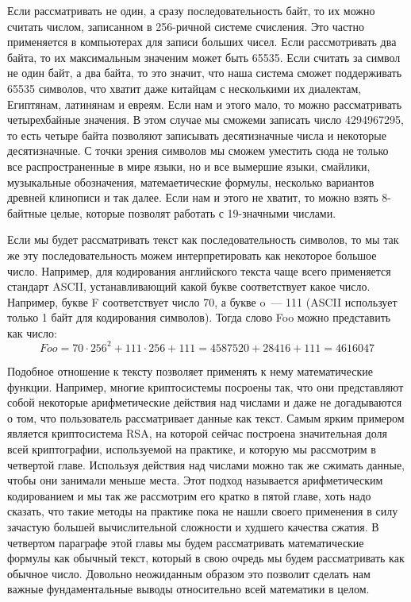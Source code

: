 Если рассматривать не один, а сразу последовательность байт, то их можно считать числом, записанном в 256-ричной системе счисления. Это частно применяется в компьютерах для записи больших чисел. Если рассмотривать два байта, то их максимальным значеним может быть 65535. Если считать за символ не один байт, а два байта, то это значит, что наша система сможет поддерживать 65535 символов, что хватит даже китайцам с несколькими их диалектам, Египтянам, латинянам и евреям. Если нам и этого мало, то можно рассматривать четырехбайные значения. В этом случае мы сможеми записать число 4294967295, то есть четыре байта позволяют записывать десятизначные числа и некоторые десятизначные. С точки зрения символов мы сможем уместить сюда не только все распространенные в мире языки, но и все вымершие языки, смайлики, музыкальные обозначения, матемаетические формулы, несколько вариантов древней клинописи и так далее. Если нам и этого не хватит, то можно взять 8-байтные целые, которые позволят работать с 19-значными числами.

Если мы будет рассматривать текст как последовательность символов, то мы так же эту последовательность можем интерпретировать как некоторое большое число. Например, для кодирования английского текста чаще всего применяется стандарт ASCII, устанавливающий какой букве соответствует какое число. Например, букве F соответствует число 70, а букве o~--- 111 (ASCII использует только 1 байт для кодирования символов). Тогда слово Foo можно представить как число:
$$Foo = 70 \cdot 256^2 + 111 \cdot 256 + 111 = 4587520 + 28416 + 111 = 4616047$$

Подобное отношение к тексту позволяет применять к нему математические функции. Например, многие криптосистемы посроены так, что они представляют собой некоторые арифметические действия над числами и даже не догадываются о том, что пользователь рассматривает данные как текст. Самым ярким примером является криптосистема RSA, на которой сейчас построена значительная доля всей криптографии, используемой на практике, и которую мы рассмотрим в четвертой главе. Используя действия над числами можно так же сжимать данные, чтобы они занимали меньше места. Этот подход называется арифметическим кодированием и мы так же рассмотрим его кратко в пятой главе, хоть надо сказать, что такие методы на практике пока не нашли своего применения в силу зачастую большей вычислительной сложности и худшего качества сжатия. В четвертом параграфе этой главы мы будем рассматривать математические формулы как обычный текст, который в свою очредь мы будем рассматривать как обычное число. Довольно неожиданным образом это позволит сделать нам важные фундаментальные выводы относительно всей математики в целом.

